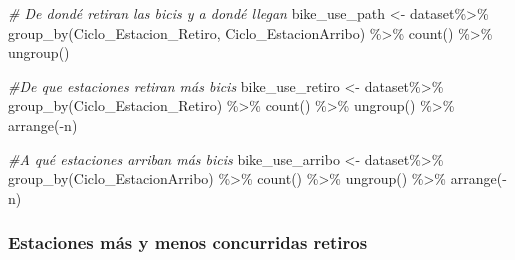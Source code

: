 \documentclass[
]{article}
\newenvironment{Shaded}{\begin{snugshade}}{\end{snugshade}}
\newcommand{\CommentTok}[1]{\textcolor[rgb]{0.56,0.35,0.01}{\textit{#1}}}
\newcommand{\FunctionTok}[1]{\textcolor[rgb]{0.00,0.00,0.00}{#1}}
\newcommand{\NormalTok}[1]{#1}
\newcommand{\OtherTok}[1]{\textcolor[rgb]{0.56,0.35,0.01}{#1}}
\newcommand{\SpecialCharTok}[1]{\textcolor[rgb]{0.00,0.00,0.00}{#1}}
\begin{document}
\begin{Shaded}
\begin{Highlighting}[]
\CommentTok{\# De dondé retiran las bicis y a dondé llegan}
\NormalTok{bike\_use\_path }\OtherTok{\textless{}{-}}\NormalTok{ dataset}\SpecialCharTok{\%\textgreater{}\%} 
    \FunctionTok{group\_by}\NormalTok{(Ciclo\_Estacion\_Retiro, Ciclo\_EstacionArribo) }\SpecialCharTok{\%\textgreater{}\%} 
    \FunctionTok{count}\NormalTok{() }\SpecialCharTok{\%\textgreater{}\%} 
    \FunctionTok{ungroup}\NormalTok{()}

\CommentTok{\#De que estaciones retiran más bicis}
\NormalTok{bike\_use\_retiro }\OtherTok{\textless{}{-}}\NormalTok{ dataset}\SpecialCharTok{\%\textgreater{}\%} 
    \FunctionTok{group\_by}\NormalTok{(Ciclo\_Estacion\_Retiro) }\SpecialCharTok{\%\textgreater{}\%} 
    \FunctionTok{count}\NormalTok{() }\SpecialCharTok{\%\textgreater{}\%} 
    \FunctionTok{ungroup}\NormalTok{() }\SpecialCharTok{\%\textgreater{}\%} 
    \FunctionTok{arrange}\NormalTok{(}\SpecialCharTok{{-}}\NormalTok{n)}


\CommentTok{\#A qué estaciones arriban más bicis}
\NormalTok{bike\_use\_arribo }\OtherTok{\textless{}{-}}\NormalTok{ dataset}\SpecialCharTok{\%\textgreater{}\%} 
    \FunctionTok{group\_by}\NormalTok{(Ciclo\_EstacionArribo) }\SpecialCharTok{\%\textgreater{}\%} 
    \FunctionTok{count}\NormalTok{() }\SpecialCharTok{\%\textgreater{}\%} 
    \FunctionTok{ungroup}\NormalTok{() }\SpecialCharTok{\%\textgreater{}\%} 
    \FunctionTok{arrange}\NormalTok{(}\SpecialCharTok{{-}}\NormalTok{n)}
\end{Highlighting}
\end{Shaded}

\hypertarget{estaciones-muxe1s-y-menos-concurridas-retiros}{%
\subsubsection{Estaciones más y menos concurridas
retiros}\label{estaciones-muxe1s-y-menos-concurridas-retiros}}
\end{document}
